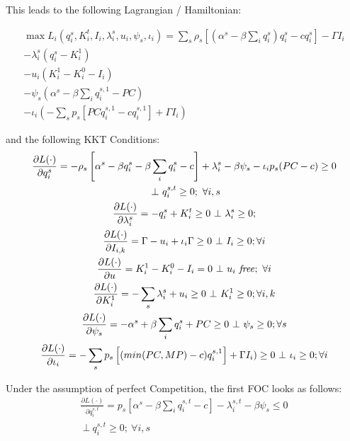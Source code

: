 \documentclass[a4paper,12pt]{article}
\theoremstyle{remark}
\begin{document}
\clearpage

This leads to the following Lagrangian / Hamiltonian:

\begin{gather}
	\max L_i(q_{i}^{s},K^t_{i},I_{i},\lambda_{i}^{s},u_{i}, \psi_s, \iota_i)= 
	 \sum_s \rho_s \left[(\alpha^s- \beta \sum_i q_{i}^{s}) q_{i}^{s} - c q_{i}^{s}  \right]	- \Gamma I_{i}  \\ \nonumber  
	  	- \lambda_{i}^{s}(q_{i}^{s} - K^{1}_{i}) \\ \nonumber
			- u_{i}(K^{1}_{i}  - K^{0}_{i}  - I_{i})		\\   \nonumber
			- \psi_s (\alpha^s - \beta  \sum_i q_i^{s,1} - PC ) \\ \nonumber
			-\iota_i (-\sum_s p_s \left[ PC q_{i}^{s,1} - c q_{i}^{s,1} \right] + \Gamma I_{i})	\nonumber			
\end{gather}

and the following KKT Conditions:
\begin{gather}
\frac{\partial L(\cdot)}{\partial q_{i}^{s}} = - \rho_s \left[ \alpha^s - \beta q_{i}^{s} - \beta \sum_i q_{i}^{s} - c \right] + \lambda_{i}^{s} - \beta \psi_s - \iota_i p_s (PC-c) \geq 0 \\ \nonumber \ \bot \ q_{i}^{s,t} \geq 0;\ \forall i,s \\
\frac{\partial L(\cdot)}{\partial \lambda_{i}^{s}} = - q_{i}^{s} + K^t_{i} \geq 0 \ \bot \ \lambda_{i}^{s} \geq 0 ; \\
\frac{\partial L(\cdot)}{\partial I_{i,k}} =  \Gamma - u_{i} + \iota_{i} \Gamma \geq 0 \ \bot \ I_{i} \geq 0 ;\forall i \\
\frac{\partial L(\cdot)}{\partial u} = K^1_{i} -  K^0_{i} - I_{i}  = 0 \ \bot \ u_{i} \ \mbox{\textit{free}}; \  \forall i  \\
\frac{\partial L(\cdot)}{\partial K^1_{i}} = -\sum_s  \lambda_{i}^{s} + u_{i} \geq 0  \ \bot \ K^1_{i} \geq 0 ; \forall i,k \\
\frac{\partial L(\cdot)}{\partial \psi_s} = -\alpha^s + \beta  \sum_i q_i^{s} + PC   \geq 0  \ \bot \ \psi_s \geq 0 ; \forall s \\
\frac{\partial L(\cdot)}{\partial \iota_i} = - \sum_s p_s \left[ (min(PC,MP) - c) q_{i}^{s,1} \right] + \Gamma I_{i})  \geq 0  \ \bot \ \iota_i \geq 0 ; \forall i \\
\end{gather}

Under the assumption of perfect Competition, the first FOC looks as follows:
\begin{gather}
\frac{\partial L(\cdot)}{\partial q_{i}^{s,t}} = p_s \left[ \alpha^s -  \beta \sum_i q_{i}^{s,t} - c \right] - \lambda_{i}^{s,t} - \beta \psi_s \leq 0 \\ \nonumber \ \bot \ q_{i}^{s,t} \geq 0;\ \forall i,s \\
\end{gather}
\end{document}
